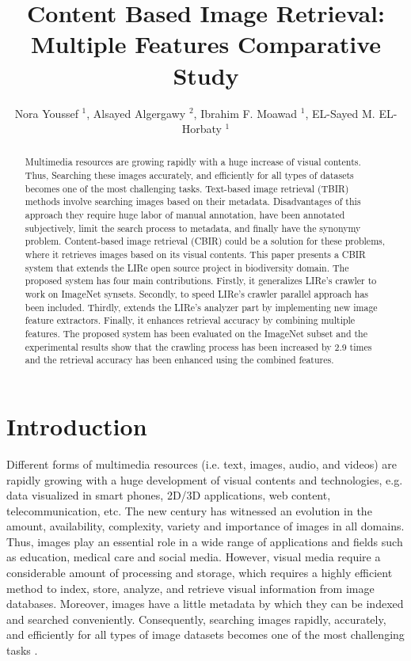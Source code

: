 \documentclass[11pt]{article}
\title{Content Based Image Retrieval: Multiple Features Comparative Study }
\author{
Nora Youssef $^1$,
Alsayed Algergawy  $^2$,
Ibrahim F. Moawad $^1$,
EL-Sayed M. EL-Horbaty $^1$
}
\begin{document}
\maketitle

	
\begin{abstract}
	Multimedia resources are growing rapidly with a huge increase of visual contents. Thus, Searching these images accurately, and efficiently for all types of datasets becomes one of the most challenging tasks. Text-based image retrieval (TBIR) methods involve searching images based on their metadata. Disadvantages of this approach they require huge labor of manual annotation, have been annotated subjectively, limit the search process to metadata, and finally have the synonymy problem. Content-based image retrieval (CBIR) could be a solution for these problems, where it retrieves images based on its visual contents. This paper presents a CBIR system that extends the LIRe open source project in biodiversity domain. The proposed system has four main contributions. Firstly, it generalizes LIRe’s crawler to work on ImageNet synsets. Secondly, to speed LIRe’s crawler parallel approach has been included. Thirdly, extends the LIRe’s analyzer part by implementing new image feature extractors. Finally, it enhances retrieval accuracy by combining multiple features. The proposed system has been evaluated on the ImageNet subset and the experimental results show that the crawling process has been increased by 2.9 times and the retrieval accuracy has been enhanced using the combined features.
\end{abstract}




\section{Introduction}	

Different forms of multimedia resources (i.e. text, images, audio, and videos) are rapidly growing with a huge development of visual contents and technologies, e.g. data visualized in smart phones, 2D/3D applications, web content, telecommunication, etc. The new century has witnessed an evolution in the amount, availability, complexity, variety and importance of images in all domains. Thus, images play an essential role in a wide range of applications and fields such as education, medical care and social media. However, visual media require a considerable amount of processing and storage, which requires a highly efficient method to index, store, analyze, and retrieve visual information from image databases. Moreover, images have a little metadata by which they can be indexed and searched conveniently.  Consequently, searching images rapidly, accurately, and efficiently for all types of image datasets becomes one of the most challenging tasks \cite{alzu2015semantic}.
\end{document}
